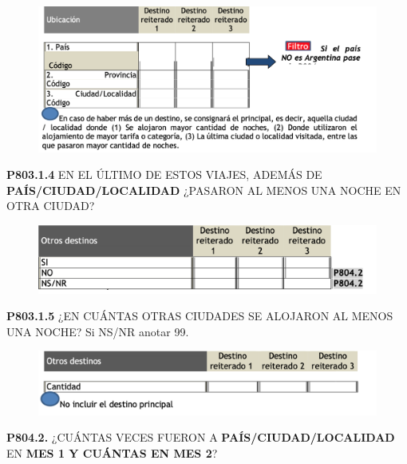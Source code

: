 \documentclass[
  openany]{book}
\begin{document}
\begin{figure}

{\centering \includegraphics[width=1\linewidth]{imagenes/figura6-255} 

}

\end{figure}

\textbf{P803.1.4} EN EL ÚLTIMO DE ESTOS VIAJES, ADEMÁS DE \textbf{PAÍS/CIUDAD/LOCALIDAD} ¿PASARON AL MENOS UNA NOCHE EN OTRA CIUDAD?

\begin{figure}

{\centering \includegraphics[width=1\linewidth]{imagenes/figura6-256} 

}

\end{figure}

\textbf{P803.1.5} ¿EN CUÁNTAS OTRAS CIUDADES SE ALOJARON AL MENOS UNA NOCHE?
Si NS/NR anotar 99.

\begin{figure}

{\centering \includegraphics[width=1\linewidth]{imagenes/figura6-257} 

}

\end{figure}

\textbf{P804.2.} ¿CUÁNTAS VECES FUERON A \textbf{PAÍS/CIUDAD/LOCALIDAD} EN \textbf{MES 1 Y CUÁNTAS EN MES 2}?
\end{document}

